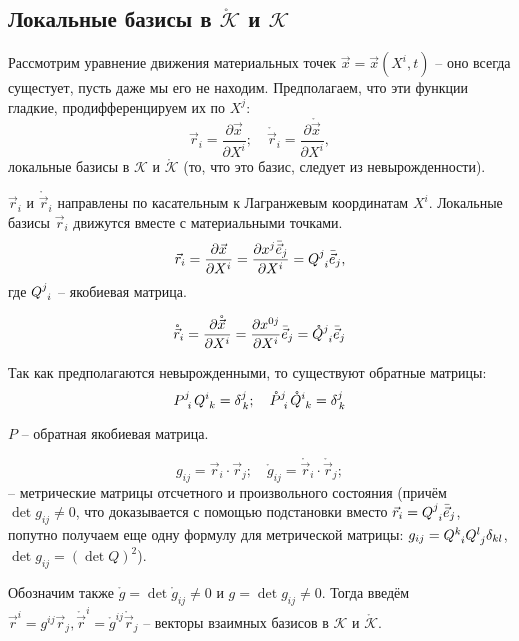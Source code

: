 \subsection{Локальные базисы в $\mathring{\mathcal{K}}$ и $\mathcal{K}$}

Рассмотрим уравнение движения материальных точек $\vec{x} = \vec{x} (X^i, t)$ -- оно всегда
сущестует, пусть даже мы его не находим. Предполагаем, что эти функции гладкие, продифференцируем
их по $X^j$:
\[
  \vec{r}_i = \dfrac{\partial \vec{x}}{\partial X^i}; \quad
  \mathring{\vec{r}}_i = \dfrac{\partial \mathring{\vec{x}}}{\partial X^i},
\]
локальные базисы в $\mathcal{K}$ и $\mathring{\mathcal{K}}$ (то, что это базис, следует из
невырожденности).

\begin{wrapfigure}{r}{0.5\textwidth}
	\centering
	
\end{wrapfigure}

$\vec{r}_i$ и $\mathring{\vec{r}}_i$ направлены по касательным к Лагранжевым координатам $X^i$. 
Локальные базисы $\vec{r}_i$ движутся вместе с материальными точками. 
\[
  \vec{r}_i
  = \dfrac{\partial \vec{x}}{\partial X^i}
  = \dfrac{\partial x^j \bar{\vec{e}}_j}{\partial X^i}  
  = \tensor{Q}{^j_i} \bar{\vec{e}}_j,
\]
где $\tensor{Q}{^j_i}$ -- якобиевая матрица.

\[
  \mathring{\vec{r}}_i = \dfrac{\partial \mathring{\vec{x}}}{\partial X^i}
  = \dfrac{\partial x^{0j}}{\partial X^i} \bar{\vec{e}}_j
  = \tensor{\mathring{Q}}{^j_i} \bar{\vec{e}}_j
\]

Так как предполагаются невырожденными, то существуют обратные матрицы:
\[
  \tensor{P}{^j_i} \tensor{Q}{^i_k} = \delta^j_{\, k}; \quad
  \tensor{\mathring{P}}{^j_i} \tensor{\mathring{Q}}{^i_k} = \delta^j_{\, k}
\]

$P$ -- обратная якобиевая матрица.

\[
  g_{ij} = \vec{r}_i \cdot \vec{r}_j; 
  \quad
  \mathring{g}_{ij} = \mathring{\vec{r}}_i \cdot \mathring{\vec{r}}_j;
\]
-- метрические матрицы отсчетного и произвольного состояния (причём $\det g_{ij} \neq 0$, что
доказывается с помощью подстановки вместо $\vec{r}_i = \tensor{Q}{^j_i} \bar{\vec{e}}_j$, попутно
получаем еще одну формулу для метрической матрицы: 
$g_{ij} = \tensor{Q}{^k_i} \tensor{Q}{^l_j} \delta_{kl}$, $\det g_{ij} = (\det Q )^2$).

Обозначим также $\mathring{g} = \det \mathring{g}_{ij} \neq 0$ и $g = \det g_{ij} \neq 0$.
Тогда введём $\vec{r}^i  = g^{ij} \vec{r}_j, \mathring{\vec{r}}^i = \mathring{g}^{ij}
\mathring{\vec{r}}_j$ --
векторы взаимных базисов в $\mathcal{K}$ и $\mathring{\mathcal{K}}$.

